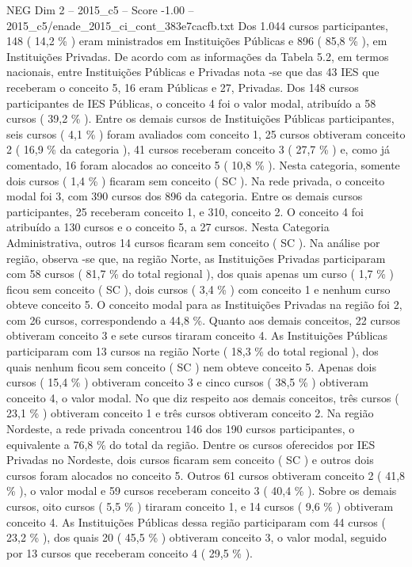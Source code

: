 \begin{textsample}{NEG Dim 2 – 2015\_c5 – Score -1.00 – 2015\_c5/enade\_2015\_ci\_cont\_383e7cacfb.txt}
Dos 1.044 cursos participantes, 148 ( 14,2 \% ) eram ministrados em Instituições Públicas e 896 ( 85,8 \% ), em Instituições Privadas.
De acordo com as informações da Tabela 5.2, em termos nacionais, entre Instituições Públicas e Privadas nota -se que das 43 IES que receberam o conceito 5, 16 eram Públicas e 27, Privadas.
Dos 148 cursos participantes de IES Públicas, o conceito 4 foi o valor modal, atribuído a 58 cursos ( 39,2 \% ).
Entre os demais cursos de Instituições Públicas participantes, seis cursos ( 4,1 \% ) foram avaliados com conceito 1, 25 cursos obtiveram conceito 2 ( 16,9 \% da categoria ), 41 cursos receberam conceito 3 ( 27,7 \% ) e, como já comentado, 16 foram alocados ao conceito 5 ( 10,8 \% ).
Nesta categoria, somente dois cursos ( 1,4 \% ) ficaram sem conceito ( SC ).
Na rede privada, o conceito modal foi 3, com 390 cursos dos 896 da categoria.
Entre os demais cursos participantes, 25 receberam conceito 1, e 310, conceito 2.
O conceito 4 foi atribuído a 130 cursos e o conceito 5, a 27 cursos.
Nesta Categoria Administrativa, outros 14 cursos ficaram sem conceito ( SC ).
Na análise por região, observa -se que, na região Norte, as Instituições Privadas participaram com 58 cursos ( 81,7 \% do total regional ), dos quais apenas um curso ( 1,7 \% ) ficou sem conceito ( SC ), dois cursos ( 3,4 \% ) com conceito 1 e nenhum curso obteve conceito 5.
O conceito modal para as Instituições Privadas na região foi 2, com 26 cursos, correspondendo a 44,8 \%.
Quanto aos demais conceitos, 22 cursos obtiveram conceito 3 e sete cursos tiraram conceito 4.
As Instituições Públicas participaram com 13 cursos na região Norte ( 18,3 \% do total regional ), dos quais nenhum ficou sem conceito ( SC ) nem obteve conceito 5.
Apenas dois cursos ( 15,4 \% ) obtiveram conceito 3 e cinco cursos ( 38,5 \% ) obtiveram conceito 4, o valor modal.
No que diz respeito aos demais conceitos, três cursos ( 23,1 \% ) obtiveram conceito 1 e três cursos obtiveram conceito 2.
Na região Nordeste, a rede privada concentrou 146 dos 190 cursos participantes, o equivalente a 76,8 \% do total da região.
Dentre os cursos oferecidos por IES Privadas no Nordeste, dois cursos ficaram sem conceito ( SC ) e outros dois cursos foram alocados no conceito 5.
Outros 61 cursos obtiveram conceito 2 ( 41,8 \% ), o valor modal e 59 cursos receberam conceito 3 ( 40,4 \% ).
Sobre os demais cursos, oito cursos ( 5,5 \% ) tiraram conceito 1, e 14 cursos ( 9,6 \% ) obtiveram conceito 4.
As Instituições Públicas dessa região participaram com 44 cursos ( 23,2 \% ), dos quais 20 ( 45,5 \% ) obtiveram conceito 3, o valor modal, seguido por 13 cursos que receberam conceito 4 ( 29,5 \% ).

\end{textsample}
